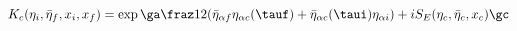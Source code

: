\begin{equation}
K_c(\eta_i,{\bar\eta}_f,x_i,x_f)=\exp\ga \fraz 12(
{\bar\eta}_{\alpha f}\eta_{\alpha c}(\tauf)+{\bar\eta}_{\alpha
c}(\taui)\eta_{\alpha i}) +iS_E(\eta_c,{\bar\eta}_c,x_c)\gc
\end{equation}

